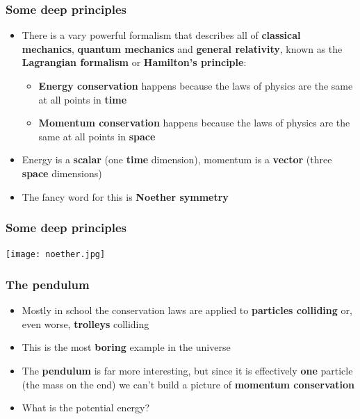 \documentclass{beamer}
\begin{document}
\begin{frame}
  \frametitle{Some deep principles}
  \begin{itemize}
    \item<1-> There is a vary powerful formalism that describes all of \textbf{classical mechanics}, \textbf{quantum mechanics} and \textbf{general relativity}, known as the \textbf{Lagrangian formalism} or \textbf{Hamilton's principle}:
      \begin{itemize}
	\item<2-> \textbf{Energy conservation} happens because the laws of physics are the same at all points in \textbf{time}
	\item<3-> \textbf{Momentum conservation} happens because the laws of physics are the same at all points in \textbf{space}
      \end{itemize}
    \item<4-> Energy is a \textbf{scalar} (one \textbf{time} dimension), momentum is a \textbf{vector} (three \textbf{space} dimensions)
    \item<5-> The fancy word for this is \textbf{Noether symmetry}
  \end{itemize}
\end{frame}

\begin{frame}
  \center
  \frametitle{Some deep principles}
  \texttt{[image: noether.jpg]}
\end{frame}

\begin{frame}
  \frametitle{The pendulum}
  \begin{itemize}
    \item<1-> Mostly in school the conservation laws are applied to \textbf{particles colliding} or, even worse, \textbf{trolleys} colliding
    \item<2-> This is the most \textbf{boring} example in the universe
    \item<3-> The \textbf{pendulum} is far more interesting, but since it is effectively \textbf{one} particle (the mass on the end) we can't build a picture of \textbf{momentum conservation}
    \item<4-> What is the potential energy?
  \end{itemize}
\end{frame}
\end{document}
